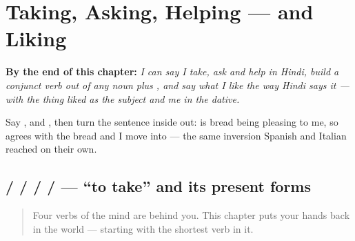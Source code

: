 
\chapter{Taking, Asking, Helping — and Liking}
\label{ch:hi-pasand}

\begin{chapteropening}
\textbf{By the end of this chapter:} \emph{I can say I take, ask and help in Hindi, build a conjunct verb out of any noun plus , and say what I like the way Hindi says it — with the thing liked as the subject and me in the dative.}

Say ,  and  , then turn the sentence inside out:     is bread being pleasing to me, so  agrees with the bread and I move into  — the same inversion Spanish and Italian reached on their own.
\end{chapteropening}

\section[\texorpdfstring{\hi{लेना} / \hi{ले} / \hi{लेता} … (lenā / le / letā …)}{लेना / ले / लेता … (lenā / le / letā …)}]{ /  /  /  /  — \textquotedblleft{}to take\textquotedblright{} and its present forms}

\label{lesson:HI-C35-lena}



\begin{quote}
Four verbs of the mind are behind you. This chapter puts your hands back in the world — starting with the shortest verb in it.
\end{quote}


